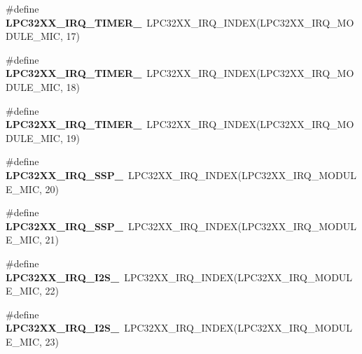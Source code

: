 \begin{DoxyCompactItemize}
\#define {\bfseries L\+P\+C32\+X\+X\+\_\+\+I\+R\+Q\+\_\+\+T\+I\+M\+E\+R\+\_}~L\+P\+C32\+X\+X\+\_\+\+I\+R\+Q\+\_\+\+I\+N\+D\+EX(L\+P\+C32\+X\+X\+\_\+\+I\+R\+Q\+\_\+\+M\+O\+D\+U\+L\+E\+\_\+\+M\+IC, 17)
\item 
\mbox{\label{group__lpc32xx__interrupt_ga3b94af1c07d871d6c4d5bc75c4976b66}} 
\#define {\bfseries L\+P\+C32\+X\+X\+\_\+\+I\+R\+Q\+\_\+\+T\+I\+M\+E\+R\+\_}~L\+P\+C32\+X\+X\+\_\+\+I\+R\+Q\+\_\+\+I\+N\+D\+EX(L\+P\+C32\+X\+X\+\_\+\+I\+R\+Q\+\_\+\+M\+O\+D\+U\+L\+E\+\_\+\+M\+IC, 18)
\item 
\mbox{\label{group__lpc32xx__interrupt_gafcb77b2805c7e22d0a5dac114837d3b7}} 
\#define {\bfseries L\+P\+C32\+X\+X\+\_\+\+I\+R\+Q\+\_\+\+T\+I\+M\+E\+R\+\_}~L\+P\+C32\+X\+X\+\_\+\+I\+R\+Q\+\_\+\+I\+N\+D\+EX(L\+P\+C32\+X\+X\+\_\+\+I\+R\+Q\+\_\+\+M\+O\+D\+U\+L\+E\+\_\+\+M\+IC, 19)
\item 
\mbox{\label{group__lpc32xx__interrupt_ga9a7c9e16506866fdc7aeb9f34bbaa73f}} 
\#define {\bfseries L\+P\+C32\+X\+X\+\_\+\+I\+R\+Q\+\_\+\+S\+S\+P\+\_}~L\+P\+C32\+X\+X\+\_\+\+I\+R\+Q\+\_\+\+I\+N\+D\+EX(L\+P\+C32\+X\+X\+\_\+\+I\+R\+Q\+\_\+\+M\+O\+D\+U\+L\+E\+\_\+\+M\+IC, 20)
\item 
\mbox{\label{group__lpc32xx__interrupt_ga20f271cf087151dcff21718854fd7d09}} 
\#define {\bfseries L\+P\+C32\+X\+X\+\_\+\+I\+R\+Q\+\_\+\+S\+S\+P\+\_}~L\+P\+C32\+X\+X\+\_\+\+I\+R\+Q\+\_\+\+I\+N\+D\+EX(L\+P\+C32\+X\+X\+\_\+\+I\+R\+Q\+\_\+\+M\+O\+D\+U\+L\+E\+\_\+\+M\+IC, 21)
\item 
\mbox{\label{group__lpc32xx__interrupt_gae40ffff467f99a62d759d15ba415cce3}} 
\#define {\bfseries L\+P\+C32\+X\+X\+\_\+\+I\+R\+Q\+\_\+\+I2\+S\+\_}~L\+P\+C32\+X\+X\+\_\+\+I\+R\+Q\+\_\+\+I\+N\+D\+EX(L\+P\+C32\+X\+X\+\_\+\+I\+R\+Q\+\_\+\+M\+O\+D\+U\+L\+E\+\_\+\+M\+IC, 22)
\item 
\mbox{\label{group__lpc32xx__interrupt_ga7f48075e6c274938064011bdc405beaf}} 
\#define {\bfseries L\+P\+C32\+X\+X\+\_\+\+I\+R\+Q\+\_\+\+I2\+S\+\_}~L\+P\+C32\+X\+X\+\_\+\+I\+R\+Q\+\_\+\+I\+N\+D\+EX(L\+P\+C32\+X\+X\+\_\+\+I\+R\+Q\+\_\+\+M\+O\+D\+U\+L\+E\+\_\+\+M\+IC, 23)
\item 

\end{DoxyCompactItemize}
